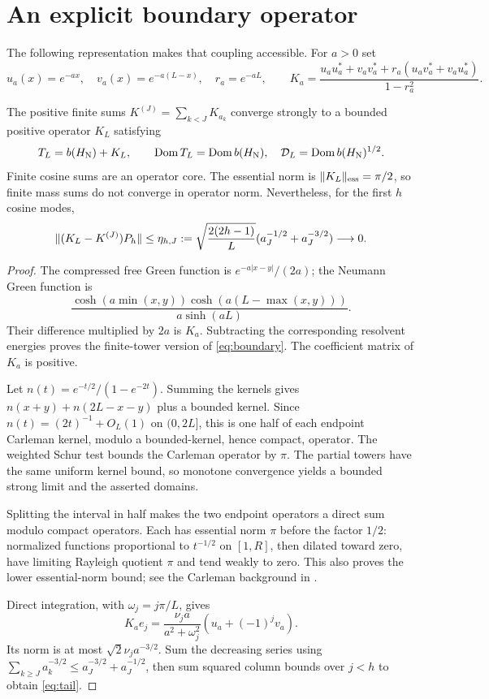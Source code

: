 \section{An explicit boundary operator}
The following representation makes that coupling accessible. For $a>0$ set
\[
u_a(x)=e^{-ax},\quad v_a(x)=e^{-a(L-x)},\quad r_a=e^{-aL},\qquad
K_a=\frac{u_au_a^*+v_av_a^*+r_a(u_av_a^*+v_au_a^*)}{1-r_a^2}.
\]
\begin{theorem}\label{thm:boundary}
The positive finite sums $K^{(J)}=\sum_{k<J}K_{a_k}$ converge strongly to
a bounded positive operator $K_L$ satisfying
\begin{equation}\label{eq:boundary}
T_L=b(H_{\rm N})+K_L,\qquad
\operatorname{Dom} T_L=\operatorname{Dom} b(H_{\rm N}),\quad
\mathcal D_L=\operatorname{Dom} b(H_{\rm N})^{1/2}.
\end{equation}
Finite cosine sums are an operator core. The essential norm is
$\lVert K_L\rVert_{\rm ess}=\pi/2$, so finite mass sums do not converge in
operator norm. Nevertheless, for the first $h$ cosine modes,
\begin{equation}\label{eq:tail}
\lVert (K_L-K^{(J)})P_h\rVert\le
\eta_{h,J}:=\sqrt{\frac{2(2h-1)}L}
 (a_J^{-1/2}+a_J^{-3/2})\longrightarrow0.
\end{equation}
\end{theorem}
\begin{proof}
The compressed free Green function is $e^{-a|x-y|}/(2a)$; the Neumann
Green function is
\[
\frac{\cosh(a\min(x,y))\cosh(a(L-\max(x,y)))}{a\sinh(aL)}.
\]
Their difference multiplied by $2a$ is $K_a$. Subtracting the corresponding
resolvent energies proves the finite-tower version of \eqref{eq:boundary}.
The coefficient matrix of $K_a$ is positive.

Let $n(t)=e^{-t/2}/(1-e^{-2t})$. Summing the kernels gives
$n(x+y)+n(2L-x-y)$ plus a bounded kernel. Since
$n(t)=(2t)^{-1}+O_L(1)$ on $(0,2L]$, this is one half of each endpoint
Carleman kernel, modulo a bounded-kernel, hence compact, operator. The
weighted Schur test bounds the Carleman operator by $\pi$. The partial
towers have the same uniform kernel bound, so monotone convergence yields
a bounded strong limit and the asserted domains.

Splitting the interval in half makes the two endpoint operators a direct
sum modulo compact operators. Each has essential norm $\pi$ before the
factor $1/2$: normalized functions proportional to $t^{-1/2}$ on $[1,R]$,
then dilated toward zero, have limiting Rayleigh quotient $\pi$ and tend
weakly to zero. This also proves the lower essential-norm bound; see the
Carleman background in \cite{Yafaev}.

Direct integration, with $\omega_j=j\pi/L$, gives
\begin{equation}\label{eq:column}
K_ae_j=\frac{\nu_j a}{a^2+\omega_j^2}(u_a+(-1)^jv_a).
\end{equation}
Its norm is at most $\sqrt2\nu_j a^{-3/2}$. Sum the decreasing series
using $\sum_{k\ge J}a_k^{-3/2}\le a_J^{-3/2}+a_J^{-1/2}$, then sum squared
column bounds over $j<h$ to obtain \eqref{eq:tail}.
\end{proof}

